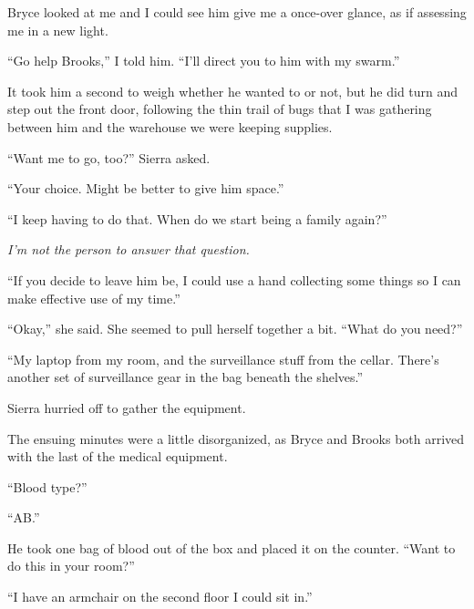 Bryce looked at me and I could see him give me a once-over glance, as if assessing me in a new light.



``Go help Brooks,'' I told him.  ``I'll direct you to him with my swarm.''



It took him a second to weigh whether he wanted to or not, but he did turn and step out the front door, following the thin trail of bugs that I was gathering between him and the warehouse we were keeping supplies.



``Want me to go, too?'' Sierra asked.



``Your choice.  Might be better to give him space.''



``I keep having to do that.  When do we start being a family again?''



\emph{I'm not the person to answer that question.}



``If you decide to leave him be, I could use a hand collecting some things so I can make effective use of my time.''



``Okay,'' she said.  She seemed to pull herself together a bit.  ``What do you need?''



``My laptop from my room, and the surveillance stuff from the cellar.  There's another set of surveillance gear in the bag beneath the shelves.''



Sierra hurried off to gather the equipment.



The ensuing minutes were a little disorganized, as Bryce and Brooks both arrived with the last of the medical equipment.



``Blood type?''



``AB.''



He took one bag of blood out of the box and placed it on the counter.  ``Want to do this in your room?''



``I have an armchair on the second floor I could sit in.''



